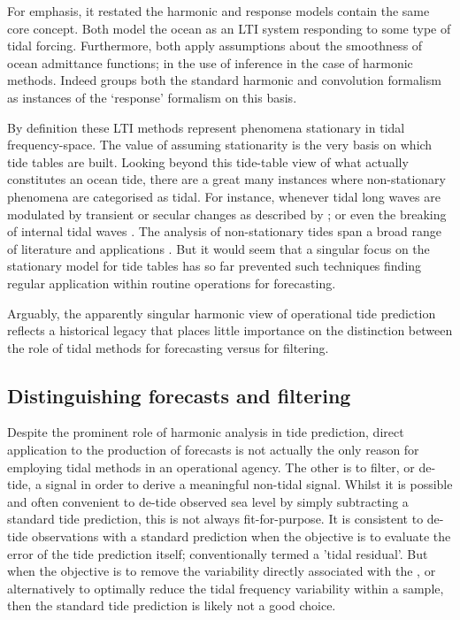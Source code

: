 For emphasis, it restated the harmonic and response models contain the same core concept.   Both model the ocean as an LTI system responding to some type of tidal forcing.   Furthermore, both apply assumptions about the smoothness of ocean admittance functions; in the use of inference in the case of harmonic methods.  Indeed \citep[chpt6]{Fu:2001ub} groups both the standard harmonic and convolution formalism as instances of the `response' formalism on this basis.

By definition these LTI methods represent phenomena stationary in tidal frequency-space.   The value of assuming stationarity is the very basis on which tide tables are built. 
Looking beyond this tide-table view of what actually constitutes an ocean tide, there are a great many instances where non-stationary phenomena are categorised as tidal.    For instance, whenever tidal long waves are modulated by transient or secular changes as described by \citet{Devlin:2017hu};   or even the breaking of internal tidal waves \citep{10.3389/fmars.2021.629372}.
The analysis of non-stationary tides span a broad range of literature and applications \citep{Jay:2003bj}.
But it would seem that a singular focus on the stationary model for tide tables has so far prevented such techniques finding regular application within routine operations for forecasting.  

Arguably, the apparently singular harmonic view of operational tide prediction reflects a historical legacy that places little importance on the distinction between the role of tidal methods for forecasting versus for filtering.

\subsection{Distinguishing forecasts and filtering}

Despite the prominent role of harmonic analysis in tide prediction, direct application to the production of forecasts is not actually the only reason for employing tidal methods in an operational agency.   
The other is to filter, or de-tide, a signal in order to derive a meaningful non-tidal signal.    Whilst it is possible and often convenient to de-tide observed sea level by simply subtracting a standard tide prediction, this is not always fit-for-purpose.
It is consistent to de-tide observations with a standard prediction when the objective is to evaluate the error of the tide prediction itself; conventionally termed a 'tidal residual'.
But when the objective is to remove the variability directly associated with the \ATGP{}, or alternatively to optimally reduce the tidal frequency variability within a sample, then the standard tide prediction is likely not a good choice.


